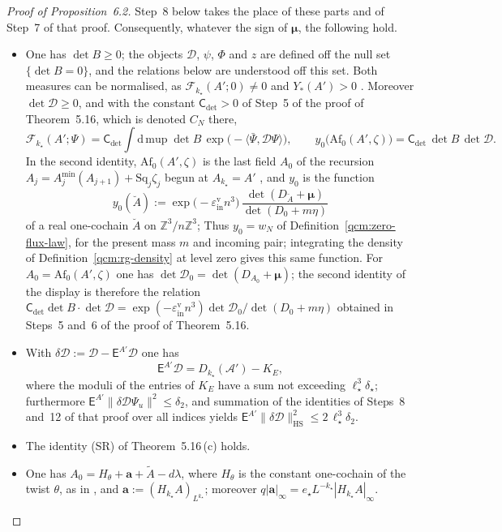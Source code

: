 \documentclass[11pt,letterpaper,reqno]{amsart}
\theoremstyle{definition}
\begin{document}
\begin{proof}[Proof of Proposition~6.2]
Step~8 below takes the place of these parts and of Step~7 of that proof.
Consequently, whatever the sign of $\boldsymbol\mu$, the following hold.
\begin{itemize}
\item[(i)] One has $\det B\ge0$;
the objects $\mathcal D$, $\psi$, $\Phi$ and $z$ are defined off the null set $\{\det B=0\}$, and the relations below are understood off this set.
Both measures can be normalised, as $\mathscr F_{k_\star}(A';0)\ne0$ and $Y_*(A')>0$ \cite[Proposition~10.4, Theorem~22.2 and Proposition~22.6]{QEDConstruction}.
Moreover $\det\mathcal D\ge0$, and with the constant $\mathsf C_{\det}>0$ of Step~5 of the proof of Theorem~5.16, which is denoted $C_N$ there,
\begin{equation*}
\mathscr F_{k_\star}(A';\Psi)=\mathsf C_{\det}\int\mathrm d\,\mathrm{mup}\;\det B\,\exp\bigl(-\langle\bar\Psi,\mathcal D\Psi\rangle\bigr),\qquad y_0\bigl(\mathrm{Af}_0(A',\zeta)\bigr)=\mathsf C_{\det}\,\det B\,\det\mathcal D .
\end{equation*}
In the second identity, $\mathrm{Af}_0(A',\zeta)$ is the last field $A_0$ of the recursion $A_j=A^{\min}_j(A_{j+1})+\mathrm{Sq}_j\zeta_j$ begun at $A_{k_\star}=A'$ \cite[equation~(22.1)]{QEDConstruction}, and $y_0$ is the function
\begin{equation*}
y_0(\breve A):=\exp\bigl(-\varepsilon^{\mathrm v}_{\mathrm{in}}n^3\bigr)\,\frac{\det(D_{\breve A}+\boldsymbol\mu)}{\det(D_0+m\eta)}
\end{equation*}
of a real one-cochain $\breve A$ on $\mathbb Z^3/n\mathbb Z^3$;
Thus $y_0=w_N$ of Definition~\ref{qcm:zero-flux-law}, for the present mass $m$ and incoming pair; integrating the density of Definition~\ref{qcm:rg-density} at level zero gives this same function.
For $A_0=\mathrm{Af}_0(A',\zeta)$ one has $\det\mathcal D_0=\det(D_{A_0}+\boldsymbol\mu)$;
the second identity of the display is therefore the relation $\mathsf C_{\det}\det B\cdot\det\mathcal D=\allowbreak \exp(-\varepsilon^{\mathrm v}_{\mathrm{in}}n^3)\det\mathcal D_0/\det(D_0+m\eta)$ obtained in Steps~5 and~6 of the proof of Theorem~5.16.
\item[(ii)] With $\delta\mathcal D:=\mathcal D-\mathsf E^{A'}\mathcal D$ one has
\begin{equation*}
\mathsf E^{A'}\mathcal D=D_{k_\star}(\mathscr A')-K_E,
\end{equation*}
where the moduli of the entries of $K_E$ have a sum not exceeding $\ell_\star^3\delta_\star$;
furthermore $\mathsf E^{A'}\|\delta\mathcal D\Psi_u\|^2\le\delta_2$, and summation of the identities of Steps~8 and~12 of that proof over all indices yields $\mathsf E^{A'}\|\delta\mathcal D\|^2_{\mathrm{HS}}\le2\,\allowbreak \ell_\star^3\delta_2$.
\item[(iii)] The identity (SR) of Theorem~5.16\,(c) holds.
\item[(iv)] One has $A_0=H_\theta+\mathbf a+\tilde A-d\lambda$, where $H_\theta$ is the constant one-cochain of the twist $\theta$, as in \cite[equation~(22.8)]{QEDConstruction}, and $\mathbf a:=(H_{k_\star}A)_{L^{k_\star}}$;
moreover $q|\mathbf a|_\infty=e_\star L^{-k_\star}|H_{k_\star}A|_\infty$.
\end{itemize}


\end{proof}
\end{document}
